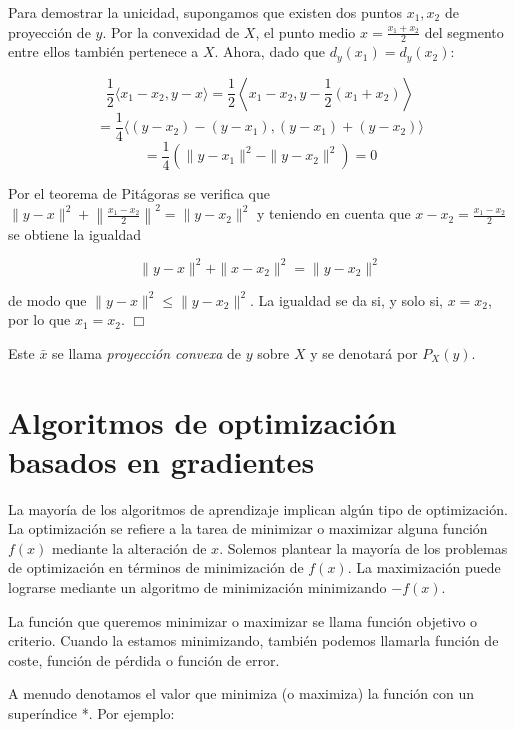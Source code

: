 \vspace{0.2cm}

Para demostrar la unicidad, supongamos que existen dos puntos $x_1, x_2$ de proyección de $y$. Por la convexidad de $X$, el punto medio $x = \frac{x_1 + x_2}{2}$ del segmento entre ellos también pertenece a $X$. Ahora, dado que $d_y(x_1) = d_y(x_2)$:

\[
\frac{1}{2} \langle x_1 - x_2, y - x \rangle = \frac{1}{2} \left\langle x_1 - x_2, y - \frac{1}{2}(x_1 + x_2) \right\rangle
\]
\[
= \frac{1}{4} \langle (y - x_2) - (y - x_1), (y - x_1) + (y - x_2) \rangle
\]
\[
= \frac{1}{4} \left( \|y - x_1\|^2 - \|y - x_2\|^2 \right) = 0
\]

\vspace{0.2cm}

Por el teorema de Pitágoras se verifica que $\|y - x\|^2 + \left\|\frac{x_1 - x_2}{2}\right\|^2 = \|y - x_2\|^2$ y teniendo en cuenta que $x - x_2 = \frac{x_1 - x_2}{2}$ se obtiene la igualdad

\[
\|y - x\|^2 + \|x - x_2\|^2 = \|y - x_2\|^2
\]

\vspace{0.2cm}

de modo que $\|y - x\|^2 \leq \|y - x_2\|^2$. La igualdad se da si, y solo si, $x = x_2$, por lo que $x_1 = x_2$. \hfill $\Box$

Este $\bar{x}$ se llama \textit{proyección convexa} de $y$ sobre $X$ y se denotará por $P_X(y)$.



\section{Algoritmos de optimización basados en gradientes}
La mayoría de los algoritmos de aprendizaje implican algún tipo de optimización. La optimización se refiere a la tarea de minimizar o maximizar alguna función $f(x)$ mediante la alteración de $x$. Solemos plantear la mayoría de los problemas de optimización en términos de minimización de $f(x)$. La maximización puede lograrse mediante un algoritmo de minimización minimizando $-f(x)$.

La función que queremos minimizar o maximizar se llama función objetivo o criterio. Cuando la estamos minimizando, también podemos llamarla función de coste, función de pérdida o función de error. 

A menudo denotamos el valor que minimiza (o maximiza) la función con un superíndice *. Por ejemplo:

